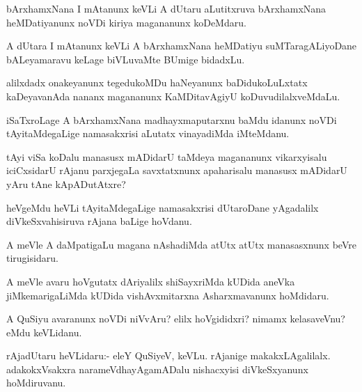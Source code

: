 \begin{mng}
bArxhamxNana I mAtanunx keVLi A dUtaru aLutitxruva bArxhamxNana heMDatiyanunx noVDi kiriya magananunx koDeMdaru.
\end{mng}

\begin{mng}
A dUtara I mAtanunx keVLi A bArxhamxNana heMDatiyu suMTaragALiyoDane bALeyamaravu keLage biVLuvaMte BUmige bidadxLu.
\end{mng}

\begin{mng}
alilxdadx onakeyanunx tegedukoMDu haNeyanunx baDidukoLuLxtatx kaDeyavanAda nananx magananunx KaMDitavAgiyU koDuvudilalxveMdaLu.
\end{mng}

\begin{mng}
iSaTxroLage A bArxhamxNana madhayxmaputarxnu baMdu idanunx noVDi tAyitaMdegaLige namasakxrisi aLutatx vinayadiMda iMteMdanu.
\end{mng}

\begin{mng}
tAyi viSa koDalu manasusx mADidarU taMdeya magananunx vikarxyisalu iciCxsidarU rAjanu parxjegaLa savxtatxnunx apaharisalu manasusx mADidarU yAru tAne kApADutAtxre?
\end{mng}

\begin{mng}
heVgeMdu heVLi tAyitaMdegaLige namasakxrisi dUtaroDane yAgadalilx diVkeSxvahisiruva rAjana baLige hoVdanu.
\end{mng}

\begin{mng}
A meVle A daMpatigaLu magana nAshadiMda atUtx atUtx manasasxnunx beVre tirugisidaru.
\end{mng}

\begin{mng}
A meVle avaru hoVgutatx dAriyalilx shiSayxriMda kUDida aneVka jiMkemarigaLiMda kUDida vishAvxmitarxna Asharxmavanunx hoMdidaru.
\end{mng}

\begin{mng}
A QuSiyu avaranunx noVDi niVvAru? elilx hoVgididxri? nimamx kelasaveVnu? eMdu keVLidanu.
\end{mng}

\begin{mng}
rAjadUtaru heVLidaru:- eleY QuSiyeV, keVLu. rAjanige makakxLAgalilalx. adakokxVsakxra narameVdhayAgamADalu nishacxyisi diVkeSxyanunx hoMdiruvanu.
\end{mng}

